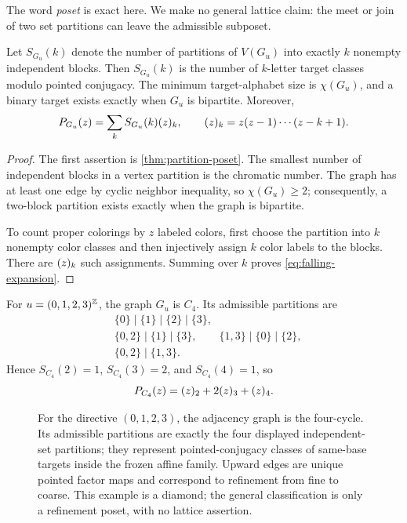 The word \emph{poset} is exact here.  We make no general lattice claim:
the meet or join of two set partitions can leave the admissible subposet.

\begin{corollary}
\label{cor:graph-counts}
  Let $S_{G_u}(k)$ denote the number of partitions of $V(G_u)$ into
  exactly $k$ nonempty independent blocks.  Then $S_{G_u}(k)$ is the
  number of $k$-letter target classes modulo pointed conjugacy.  The
  minimum target-alphabet size is $\chi(G_u)$, and a binary target exists
  exactly when $G_u$ is bipartite.  Moreover,
  \begin{equation}
    P_{G_u}(z)=\sum_k S_{G_u}(k)(z)_{k},
    \qquad
    (z)_{k}=z(z-1)\cdots(z-k+1).
    \label{eq:falling-expansion}
  \end{equation}
\end{corollary}

\begin{proof}
  The first assertion is \cref{thm:partition-poset}.  The smallest number
  of independent blocks in a vertex partition is the chromatic number.
  The graph has at least one edge by cyclic neighbor inequality, so
  $\chi(G_u)\geq2$; consequently, a two-block partition exists exactly when
  the graph is bipartite.

  To count proper colorings by $z$ labeled colors, first choose the
  partition into $k$ nonempty color classes and then injectively assign
  $k$ color labels to the blocks.  There are $(z)_{k}$ such assignments.
  Summing over $k$ proves \cref{eq:falling-expansion}.
\end{proof}

\begin{example}
\label{ex:c4}
  For $u=(0,1,2,3)^{\mathbb Z}$, the graph $G_u$ is $C_4$.  Its admissible
  partitions are
  \begin{align*}
    &\{0\}\mid\{1\}\mid\{2\}\mid\{3\},\\
    &\{0,2\}\mid\{1\}\mid\{3\},
      \qquad
      \{1,3\}\mid\{0\}\mid\{2\},\\
    &\{0,2\}\mid\{1,3\}.
  \end{align*}
  Hence $S_{C_4}(2)=1$, $S_{C_4}(3)=2$, and $S_{C_4}(4)=1$, so
  \[
    P_{C_4}(z)=(z)_{2}+2(z)_{3}+(z)_{4}.
  \]
\end{example}

\begin{figure}[t]
  \centering
  \resizebox{.88\textwidth}{!}{}
  \caption{For the directive $(0,1,2,3)$, the adjacency graph is the
  four-cycle.  Its admissible partitions are exactly the four displayed
  independent-set partitions; they represent pointed-conjugacy classes of
  same-base targets inside the frozen affine family.  Upward edges are
  unique pointed factor maps and correspond to refinement from fine to
  coarse.  This example is a diamond; the general classification is only a
  refinement poset, with no lattice assertion.}
  \label{fig:c4-poset}
\end{figure}
